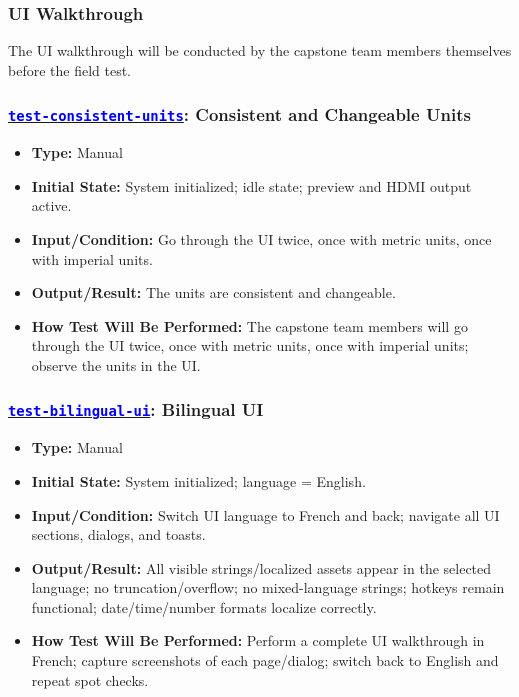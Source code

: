 \documentclass[12pt, titlepage]{article}
\newcommand{\tid}[1]{\hyperlink{tid:#1}{\textcolor{blue}{\texttt{#1}}}}
\begin{document}
\subsubsection{UI Walkthrough}

The UI walkthrough will be conducted by the capstone team members themselves
before the field test.

\subsubsection*{\tid{test-consistent-units}: Consistent and Changeable Units}
\begin{itemize}
  \item \textbf{Type:} Manual
  \item \textbf{Initial State:} System initialized; idle state; preview and HDMI output active.
  \item \textbf{Input/Condition:} Go through the UI twice, once with metric units, once with imperial units.
  \item \textbf{Output/Result:} The units are consistent and changeable.
  \item \textbf{How Test Will Be Performed:} The capstone team members will go through the UI twice, once with metric units, once with imperial units; observe the units in the UI.
\end{itemize}

\subsubsection*{\tid{test-bilingual-ui}: Bilingual UI}
\begin{itemize}
  \item \textbf{Type:} Manual
  \item \textbf{Initial State:} System initialized; language = English.
  \item \textbf{Input/Condition:} Switch UI language to French and back; navigate all UI sections, dialogs, and toasts.
  \item \textbf{Output/Result:} All visible strings/localized assets appear in the selected language; no truncation/overflow; no mixed-language strings; hotkeys remain functional; date/time/number formats localize correctly.
  \item \textbf{How Test Will Be Performed:} Perform a complete UI walkthrough in French; capture screenshots of each page/dialog; switch back to English and repeat spot checks.
\end{itemize}
\end{document}
